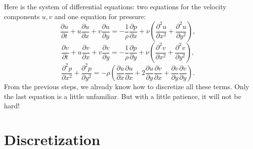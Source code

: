 \documentclass[11pt, sans]{amsart}
\begin{document}
Here is the system of differential equations: two equations for the velocity components $u,v$ and one equation for pressure:
\begin{equation}
\frac{ \partial u}{\partial t}+u\frac{\partial u}{\partial x}+v\frac{\partial u}{\partial y} = -\frac{1}{\rho}\frac{\partial p}{\partial x}+ \nu \left(\frac{\partial^2 u}{\partial x^2}+\frac{\partial^2 u}{\partial y^2} \right),
\end{equation}
\begin{equation}
\frac{\partial v}{\partial t}+u\frac{\partial v}{\partial x}+v\frac{\partial v}{\partial y} = -\frac{1}{\rho}\frac{\partial p}{\partial y}+\nu\left(\frac{\partial^2 v}{\partial x^2}+\frac{\partial^2 v}{\partial y^2}\right),
\end{equation}
\begin{equation}
\frac{\partial^2 p}{\partial x^2}+\frac{\partial^2 p}{\partial y^2} = -\rho\left(\frac{\partial u}{\partial x}\frac{\partial u}{\partial x}+2\frac{\partial u}{\partial y}\frac{\partial v}{\partial x}+\frac{\partial v}{\partial y}\frac{\partial v}{\partial y} \right).
\end{equation}
From the previous steps, we already know how to discretize all these terms. Only the last equation is a little unfamiliar. But with a little patience, it will not be hard!

\section{Discretization}
\end{document}
